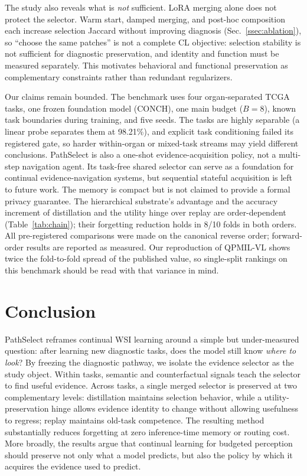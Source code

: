 \documentclass{article}
\begin{document}
The study also reveals what is \emph{not} sufficient.
LoRA merging alone does not protect the selector.
Warm start, damped merging, and post-hoc composition each increase selection Jaccard without improving diagnosis (Sec.~\ref{ssec:ablation}), so ``choose the same patches'' is not a complete CL objective: selection stability is not sufficient for diagnostic preservation, and identity and function must be measured separately.
This motivates behavioral and functional preservation as complementary constraints rather than redundant regularizers.

Our claims remain bounded.
The benchmark uses four organ-separated TCGA tasks, one frozen foundation model (CONCH), one main budget ($B=8$), known task boundaries during training, and five seeds.
The tasks are highly separable (a linear probe separates them at 98.21\%), and explicit task conditioning failed its registered gate, so harder within-organ or mixed-task streams may yield different conclusions.
PathSelect is also a one-shot evidence-acquisition policy, not a multi-step navigation agent.
Its task-free shared selector can serve as a foundation for continual evidence-navigation systems, but sequential stateful acquisition is left to future work. The memory is compact but is not claimed to provide a formal privacy guarantee. The hierarchical substrate's advantage and the accuracy increment of distillation and the utility hinge over replay are order-dependent (Table~\ref{tab:chain}); their forgetting reduction holds in 8/10 folds in both orders. All pre-registered comparisons were made on the canonical reverse order; forward-order results are reported as measured. Our reproduction of QPMIL-VL shows twice the fold-to-fold spread of the published value, so single-split rankings on this benchmark should be read with that variance in mind.

\section{Conclusion}

PathSelect reframes continual WSI learning around a simple but under-measured question: after learning new diagnostic tasks, does the model still know \emph{where to look}?
By freezing the diagnostic pathway, we isolate the evidence selector as the study object.
Within tasks, semantic and counterfactual signals teach the selector to find useful evidence.
Across tasks, a single merged selector is preserved at two complementary levels: distillation maintains selection behavior, while a utility-preservation hinge allows evidence identity to change without allowing usefulness to regress; replay maintains old-task competence.
The resulting method substantially reduces forgetting at zero inference-time memory or routing cost.
More broadly, the results argue that continual learning for budgeted perception should preserve not only what a model predicts, but also the policy by which it acquires the evidence used to predict.



\end{document}
